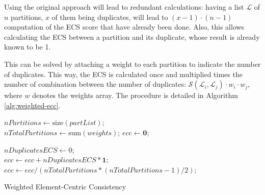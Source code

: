 Using the original approach will lead to redundant calculations: having a list $\mathcal{L}$ of $n$ partitions, $x$ of them being duplicates, will lead to $(x-1) \cdot (n-1)$ computation of the ECS score that have already been done. Also, this allows calculating the ECS between a partition and its duplicate, whose result is already known to be 1.

This can be solved by attaching a weight to each partition to indicate the number of duplicates. This way, the ECS is calculated once and multiplied times the number of combination between the number of duplicates: $\mathcal{S}(\mathcal{L}_i, \mathcal{L}_j) \cdot w_i \cdot w_j$, where $w$ denotes the weights array. The procedure is detailed in Algorithm \ref{alg:weighted-ecc}. 

\begin{algorithm}[h!] 

    $nPartitions \gets \text{size}(partList)$; \\
    $nTotalPartitions \gets \text{sum}(weights)$; 
    $ecc \gets \textbf{0}$; \\
    
    $nDuplicatesECS \gets 0$; \\
    $ecc \gets ecc + nDuplicatesECS * \textbf{1};$ \\
    $ecc \gets ecc / (nTotalPartitions * (nTotalPartitions - 1) / 2);$ \\
    \caption{Weighted Element-Centric Consistency}
    \label{alg:weighted-ecc}
\end{algorithm}

